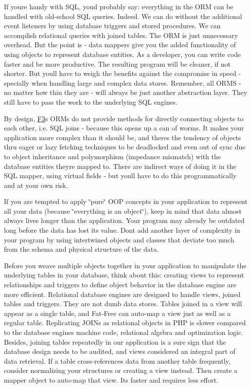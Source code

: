 If you\textquotesingle{}re handy with S\+QL, you\textquotesingle{}d probably say\+: everything in the O\+RM can be handled with old-\/school S\+QL queries. Indeed. We can do without the additional event listeners by using database triggers and stored procedures. We can accomplish relational queries with joined tables. The O\+RM is just unnecessary overhead. But the point is -\/ data mappers give you the added functionality of using objects to represent database entities. As a developer, you can write code faster and be more productive. The resulting program will be cleaner, if not shorter. But you\textquotesingle{}ll have to weigh the benefits against the compromise in speed -\/ specially when handling large and complex data stores. Remember, all O\+R\+MS -\/ no matter how thin they are -\/ will always be just another abstraction layer. They still have to pass the work to the underlying S\+QL engines.

By design, \hyperlink{class_f3}{F3}\textquotesingle{}s O\+R\+Ms do not provide methods for directly connecting objects to each other, i.\+e. S\+QL joins -\/ because this opens up a can of worms. It makes your application more complex than it should be, and there\textquotesingle{}s the tendency of objects thru eager or lazy fetching techniques to be deadlocked and even out of sync due to object inheritance and polymorphism (impedance mismatch) with the database entities they\textquotesingle{}re mapped to. There are indirect ways of doing it in the S\+QL mapper, using virtual fields -\/ but you\textquotesingle{}ll have to do this programmatically and at your own risk.

If you are tempted to apply \char`\"{}pure\char`\"{} O\+OP concepts in your application to represent all your data (because \char`\"{}everything is an object\char`\"{}), keep in mind that data almost always lives longer than the application. Your program may already be outdated long before the data has lost its value. Don\textquotesingle{}t add another layer of complexity in your program by using intertwined objects and classes that deviate too much from the schema and physical structure of the data.

Before you weave multiple objects together in your application to manipulate the underlying tables in your database, think about this\+: creating views to represent relationships and triggers to define object behavior in the database engine are more efficient. Relational database engines are designed to handle views, joined tables and triggers. They are not dumb data stores. Tables joined in a view will appear as a single table, and Fat-\/\+Free can auto-\/map a view just as well as a regular table. Replicating J\+O\+I\+Ns as relational objects in P\+HP is slower compared to the database engine\textquotesingle{}s machine code, relational algebra and optimization logic. Besides, joining tables repeatedly in our application is a sure sign that the database design needs to be audited, and views considered an integral part of data retrieval. If a table cross-\/references data from another table frequently, consider normalizing your structures or creating a view instead. Then create a mapper object to auto-\/map that view. It\textquotesingle{}s faster and requires less effort.

